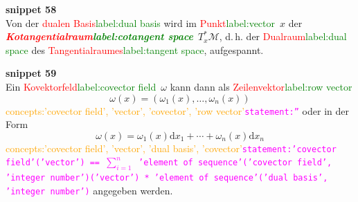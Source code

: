 \documentclass[a4paper,twoside,english,ngerman,deutsch,german,sectrefs,envcountsame,envcountchap]{svmono}
\newcommand{\setref}[2]{\textcolor{red}{#1}\textcolor{green}{#2}}
\newcommand{\snippet}[1]{\textbf{snippet #1}\\}
\newcommand{\eqnote}[2]{\textcolor{orange}{#1}\textcolor{magenta}{\texttt{#2}}}
\begin{document}
\snippet{58}
Von der \setref{dualen Basis}{label:dual basis} wird im \setref{Punkt}{label:vector}~$x$ der \textbf{\em \setref{Kotangential\-raum}{label:cotangent space}}~$T_{x}^{*}\mathcal{M}$,
d.\,h. der \setref{Dualraum}{label:dual space} des \setref{Tangentialraumes}{label:tangent space}, aufgespannt.

\snippet{59}
Ein \setref{Kovektorfeld}{label:covector field}~$\omega$
kann dann als \setref{Zeilenvektor}{label:row vector}
\[
\omega(x)=\left(\omega_{1}(x),\ldots,\omega_{n}(x)\right)
\]\eqnote{concepts:'covector field', 'vector', 'covector', 'row vector'}{statement:''}
oder in der Form
\begin{equation}
\omega(x)=\omega_{1}(x){\mathrm{d}} x_{1}+\cdots+\omega_{n}(x){\mathrm{d}} x_{n}\label{eq:Basisdarstellung-Kovektorfelder}
\end{equation}\eqnote{concepts:'covector field', 'vector', 'dual basis', 'covector'}{statement:'covector field'('vector') == $\sum_{i=1}^n$ 'element of sequence'('covector field', 'integer number')('vector') * 'element of sequence'('dual basis', 'integer number')}
angegeben werden.
\end{document}
